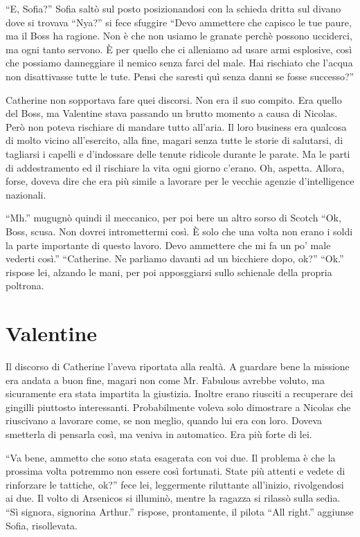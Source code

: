     ``E, Sofia?'' Sofia saltò sul posto posizionandosi con la schieda dritta sul divano dove si trovava ``Nya?'' si fece
    sfuggire ``Devo ammettere che capisco le tue paure, ma il Boss ha ragione. Non è che non usiamo le granate perchè
    possono ucciderci, ma ogni tanto servono. È per quello che ci alleniamo ad usare armi esplosive, così che possiamo
    danneggiare il nemico senza farci del male. Hai rischiato che l'acqua non disattivasse tutte le tute. Pensi che
    saresti quì senza danni se fosse successo?''

    Catherine non sopportava fare quei discorsi. Non era il suo compito. Era quello del Boss, ma Valentine stava
    passando un brutto momento a causa di Nicolas. Però non poteva rischiare di mandare tutto all'aria. Il loro business
    era qualcosa di molto vicino all'esercito, alla fine, magari senza tutte le storie di salutarsi, di tagliarsi i
    capelli e d'indossare delle tenute ridicole durante le parate. Ma le parti di addestramento ed il rischiare la vita
    ogni giorno c'erano. Oh, aspetta. Allora, forse, doveva dire che era più simile a lavorare per le vecchie agenzie
    d'intelligence nazionali.

    ``Mh.'' mugugnò quindi il meccanico, per poi bere un altro sorso di Scotch ``Ok, Boss, scusa. Non dovrei
    intromettermi così. È solo che una volta non erano i soldi la parte importante di questo lavoro. Devo ammettere che
    mi fa un po' male vederti così.'' ``Catherine. Ne parliamo davanti ad un bicchiere dopo, ok?'' ``Ok.'' rispose lei,
    alzando le mani, per poi apposggiarsi sullo schienale della propria poltrona.

  \section*{Valentine}

    Il discorso di Catherine l'aveva riportata alla realtà. A guardare bene la missione era andata a buon fine, magari
    non come Mr. Fabulous avrebbe voluto, ma sicuramente era stata impartita la giustizia. Inoltre erano riusciti a
    recuperare dei gingilli piuttosto interessanti. Probabilmente voleva solo dimostrare a Nicolas che riuscivano a
    lavorare come, se non meglio, quando lui era con loro. Doveva smetterla di pensarla così, ma veniva in automatico.
    Era più forte di lei.

    ``Va bene, ammetto che sono stata esagerata con voi due. Il problema è che la prossima volta potremmo non essere
    così fortunati. State più attenti e vedete di rinforzare le tattiche, ok?'' fece lei, leggermente riluttante
    all'inizio, rivolgendosi ai due. Il volto di Arsenicos si illuminò, mentre la ragazza si rilassò sulla sedia. ``Sì
    signora, signorina Arthur.'' rispose, prontamente, il pilota ``All right.'' aggiunse Sofia, risollevata.

